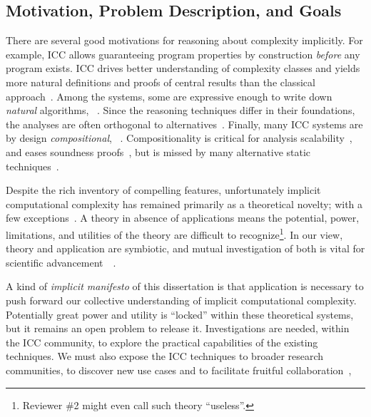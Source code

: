 \subsection{Motivation, Problem Description, and Goals}

There are several good motivations for reasoning about complexity implicitly.
For example, ICC allows guaranteeing program properties by construction \emph{before} any program exists.
ICC drives better understanding of complexity classes and yields more natural definitions and proofs of central results than the classical approach~\cite{kristiansen2017}.
Among the systems, some are expressive enough to write down \emph{natural} algorithms, \eg~\cite{jones2009,marion2011}.
Since the reasoning techniques differ in their foundations, the analyses are often orthogonal to alternatives~\cite{aubert20222}.
Finally, many ICC systems are by design \emph{compositional}, \eg~\cite{jones2009,marion2011,hainry2023,atkey2024}.
Compositionality is critical for analysis scalability~\cite{carbonneaux2015}, and eases soundness proofs~\cite{keidel2021},
but is missed by many alternative static techniques~\cite{carbonneaux2015,schiebel2024}.

Despite the rich inventory of compelling features, unfortunately implicit computational complexity has remained primarily as a theoretical novelty;
with a few exceptions~\cite{avanzini2017,moyen20172,hoffmann2012,hainry2021}.
A theory in absence of applications means the potential, power, limitations, and utilities of the theory are difficult to recognize\footnote{
Reviewer \#2 might even call such theory \enquote{useless}.}.
In our view, theory and application are symbiotic, and mutual investigation of both is vital for scientific advancement~\cite[pg. xxxv]{bishop2003}~\cite[p. 75]{moyen2017}.

A kind of \emph{implicit manifesto} of this dissertation is that application is necessary to push forward our collective understanding of implicit computational complexity.
Potentially great power and utility is \enquote{locked} within these theoretical systems, but it remains an open problem to release it.
Investigations are needed, within the ICC community, to explore the practical capabilities of the existing techniques.
We must also expose the ICC techniques to broader research communities, to discover new use cases and to facilitate fruitful collaboration~\cite[p. 7]{moyen2017},

